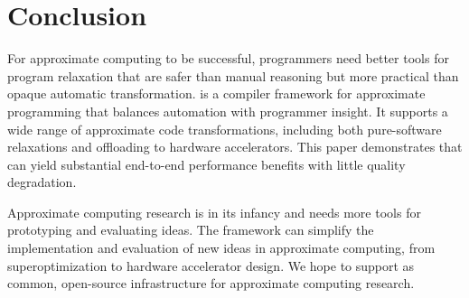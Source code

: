 \section{Conclusion}

For approximate computing to be successful,
programmers need better tools for program relaxation that are safer than
manual reasoning but more practical than opaque automatic transformation.
\sysname is a compiler framework for approximate programming that
balances automation with programmer insight.
It supports a wide range of approximate code transformations, including
both pure-software relaxations and offloading to hardware accelerators.
This paper demonstrates that \sysname can yield substantial
end-to-end performance benefits with little quality degradation.

Approximate computing research is in its infancy and needs more tools for
prototyping and evaluating ideas.
The \sysname framework can simplify the implementation and evaluation of new
ideas in approximate computing, from superoptimization to hardware accelerator
design.
We hope to support \sysname as common, open-source infrastructure for
approximate computing research.
